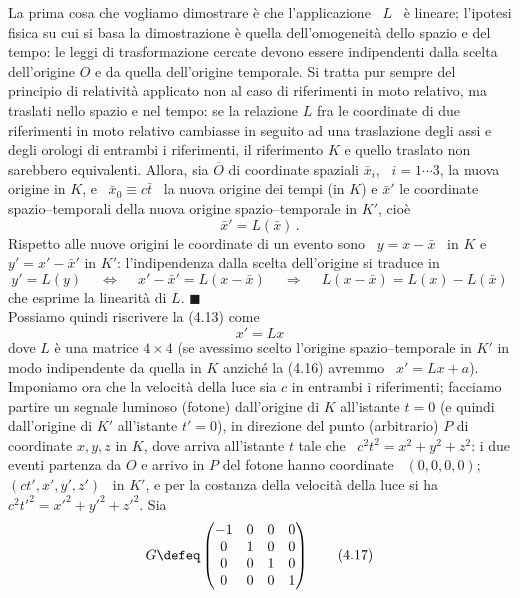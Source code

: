 La prima cosa che vogliamo dimostrare \`e che l'applicazione \ $L$ \ \`e
lineare; l'ipotesi fisica su cui si basa la dimostrazione \`e quella
dell'omogeneit\`a dello spazio e del tempo: le leggi di trasformazione cercate
devono essere indipendenti dalla scelta dell'origine $O$ e da quella
dell'origine temporale. Si tratta pur sempre del principio di relativit\`a
applicato non al caso di riferimenti in moto relativo, ma traslati nello spazio
e nel tempo: se la relazione $L$ fra le coordinate di due riferimenti in moto
relativo cambiasse in seguito ad una traslazione degli assi e degli orologi di
entrambi i riferimenti, il riferimento $K$ e quello traslato non sarebbero
equivalenti. Allora, sia $\overline O$ di coordinate spaziali $\bar x_i$,
\ $i=1\cdots3$, la nuova origine in $K$, e \ $\bar x_0\equiv c\bar t$ \ la nuova
origine dei tempi (in $K$) e $\bar x'$ le coordinate spazio--temporali della
nuova origine spazio--temporale in $K'$, cio\`e
\begin{equation}
  \bar x'=L(\bar x)\,.
  \tag{4.14}
\end{equation}
Rispetto alle nuove origini le coordinate di un evento sono \ $y=x-\bar x$ \ in
$K$ e \ $y'=x'-\bar x'$ in $K'$: l'indipendenza dalla scelta dell'origine si
traduce in
\begin{equation}
  y'=L(y)\quad\ \Leftrightarrow\quad\ x'-\bar x'=L(x-\bar x)
  \quad\ \Rightarrow\quad\ L(x-\bar x)=L(x)-L(\bar x)
  \tag{4.15}
\end{equation}
che esprime la linearit\`a di $L$. $\blacksquare$\\
Possiamo quindi riscrivere la (4.13) come
\begin{equation}
  x'=Lx
  \tag{4.16}
\end{equation}
dove $L$ \`e una matrice $4\times4$ (se avessimo scelto l'origine
spazio--temporale in $K'$ in modo indipendente da quella in $K$ anzich\'e la
(4.16) avremmo \ $x'=Lx+a$).\\
Imponiamo ora che la velocit\`a della luce sia $c$ in entrambi i riferimenti;
facciamo partire un segnale luminoso (fotone) dall'origine di $K$ all'istante
$t=0$ (e quindi dall'origine di $K'$ all'istante $t'=0$), in direzione del punto
(arbitrario) $P$ di coordinate $x,y,z$ in $K$, dove arriva all'istante $t$ tale
che \ $c^2t^2=x^2+y^2+z^2$: i due eventi partenza da $O$ e arrivo in $P$ del
fotone hanno coordinate \ $(0,0,0,0)$; \ $(ct',x',y',z')$ \ in $K'$, e per la
costanza della velocit\`a della luce si ha \ $c^2t'^2=x'^2+y'^2+z'^2$. Sia
\begin{equation}
  G\defeq\begin{pmatrix}-1&0&0&0\\0&1&0&0\\0&0&1&0\\0&0&0&1\end{pmatrix}
  \tag{4.17}
\end{equation}
